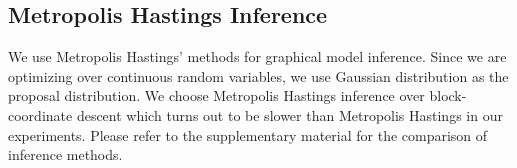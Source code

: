 

%



\subsection{Metropolis Hastings Inference}
We use Metropolis Hastings' methods \cite{mackay1998introduction} for graphical model inference. Since we are
optimizing over continuous random variables, we use Gaussian distribution as
the proposal distribution. We choose Metropolis Hastings inference over
block-coordinate descent which turns out to be slower than Metropolis Hastings
in our experiments. Please refer to the supplementary material for the
comparison of inference methods.

